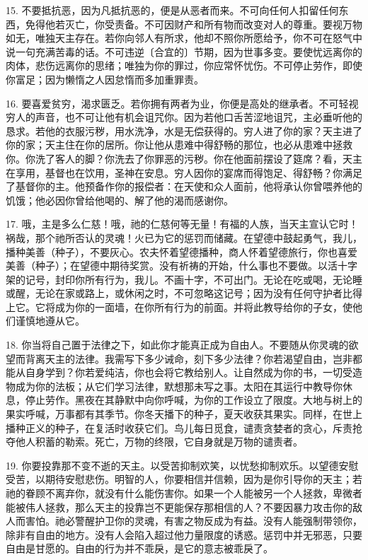 15. 不要抵抗恶，因为凡抵抗恶的，便是从恶者而来。不可向任何人扣留任何东西，免得他若灭亡，你受责备。不可因财产和所有物而改变对人的尊重。要视万物如无，唯独天主存在。若你向邻人有所求，他却不照你所愿给予，你不可在怒气中说一句充满苦毒的话。不可违逆〔合宜的〕节期，因为世事多变。要使忧远离你的肉体，悲伤远离你的思绪；唯独为你的罪过，你应常怀忧伤。不可停止劳作，即使你富足；因为懒惰之人因怠惰而多加重罪责。\newline{}\par

16. 要喜爱贫穷，渴求匮乏。若你拥有两者为业，你便是高处的继承者。不可轻视穷人的声音，也不可让他有机会诅咒你。因为若他口舌苦涩地诅咒，主必垂听他的恳求。若他的衣服污秽，用水洗净，水是无偿获得的。穷人进了你的家？天主进了你的家；天主住在你的居所。你让他从患难中得舒畅的那位，也必从患难中拯救你。你洗了客人的脚？你洗去了你罪恶的污秽。你在他面前摆设了筵席？看，天主在享用，基督也在饮用，圣神在安息。穷人因你的宴席而得饱足、得舒畅？你满足了基督你的主。他预备作你的报偿者：在天使和众人面前，他将承认你曾喂养他的饥饿；他必因你曾给他喝的、解了他的渴而感谢你。\newline{}\par

17. 哦，主是多么仁慈！哦，祂的仁慈何等无量！有福的人族，当天主宣认它时！祸哉，那个祂所否认的灵魂！火已为它的惩罚而储藏。在望德中鼓起勇气，我儿，播种美善（种子），不要灰心。农夫怀着望德播种，商人怀着望德旅行，你也喜爱美善（种子）；在望德中期待奖赏。没有祈祷的开始，什么事也不要做。以活十字架的记号，封印你所有行为，我儿。不画十字，不可出门。无论在吃或喝，无论睡或醒，无论在家或路上，或休闲之时，不可忽略这记号；因为没有任何守护者比得上它。它将成为你的一面墙，在你所有行为的前面。并将此教导给你的子女，使他们谨慎地遵从它。\par

18. 你当将自己置于法律之下，如此你才能真正成为自由人。不要随从你灵魂的欲望而背离天主的法律。我需写下多少诫命，刻下多少法律？你若渴望自由，岂非都能从自身学到？你若爱纯洁，你也会将它教给别人。让自然成为你的书，一切受造物成为你的法板；从它们学习法律，默想那未写之事。太阳在其运行中教导你休息，停止劳作。黑夜在其静默中向你呼喊，为你的工作设立了限度。大地与树上的果实呼喊，万事都有其季节。你冬天播下的种子，夏天收获其果实。同样，在世上播种正义的种子，在复活时收获它们。鸟儿每日觅食，谴责贪婪者的贪心，斥责抢夺他人积蓄的勒索。死亡，万物的终限，它自身就是万物的谴责者。\par

19. 你要投靠那不变不逝的天主。以受苦抑制欢笑，以忧愁抑制欢乐。以望德安慰受苦，以期待安慰悲伤。明智的人，你要相信并信赖，因为是你引导你的天主；若祂的眷顾不离弃你，就没有什么能伤害你。如果一个人能被另一个人拯救，卑微者能被伟人拯救，那么天主的投靠岂不更能保存那相信的人？不要因暴力攻击你的敌人而害怕。祂必警醒护卫你的灵魂，有害之物反成为有益。没有人能强制带领你，除非有自由的地方。没有人会陷入超过他力量限度的诱惑。惩罚中并无邪恶，只要自由是甘愿的。自由的行为并不乖戾，是它的意志被乖戾了。\par

